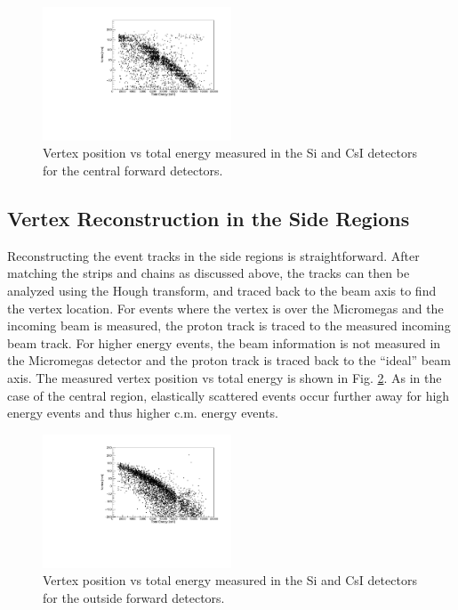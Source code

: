 \documentclass[final,number,sort&compress,5p,times,twocolumn]{elsarticle}
\begin{document}
\begin{figure}[hbt!]
	\centering
    \includegraphics[width=0.5\textwidth]{figures/9C_VertexReconstructionRegion1}
    \caption{Vertex position vs total energy measured in the Si and CsI detectors for the central forward detectors.}
    \label{fig:9C_VertexReconstructionRegion1}
\end{figure}

\subsection{Vertex Reconstruction in the Side Regions}

Reconstructing the event tracks in the side regions is straightforward. After matching the strips and chains as discussed above, the tracks can then be analyzed using the Hough transform, and traced back to the beam axis to find the vertex location. For events where the vertex is over the Micromegas and the incoming beam is measured, the proton track is traced to the measured incoming beam track. For higher energy events, the beam information is not measured in the Micromegas detector and the proton track is traced back to the ``ideal'' beam axis. The measured vertex position vs total energy is shown in Fig. \ref{fig:9C_VertexReconstructionRegion3}. As in the case of the central region, elastically scattered events occur further away for high energy events and thus higher c.m. energy events.

\begin{figure}[hbt!]
	\centering
    \includegraphics[width=0.5\textwidth]{figures/9C_VertexReconstructionRegion3}
    \caption{Vertex position vs total energy measured in the Si and CsI detectors for the outside forward detectors.}
    \label{fig:9C_VertexReconstructionRegion3}
\end{figure}
\end{document}
